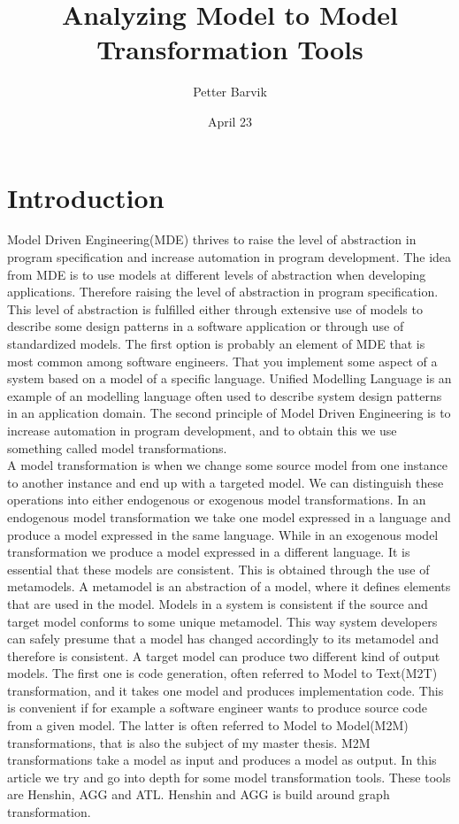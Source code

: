 \documentclass[pdftex,11pt,a4paper]{article}
\begin{document}
\title{Analyzing Model to Model Transformation
	   Tools}
\date{April 23}
\author{Petter Barvik}

\maketitle
\section{Introduction}

Model Driven Engineering(MDE)\cite{France2007} thrives to raise the level of abstraction in
program specification and increase automation in program development. The idea
from MDE is to use models at different levels of abstraction when developing
applications. Therefore raising the level of abstraction in program
specification. This level of abstraction is fulfilled either through extensive
use of models to describe some design patterns in a software application or
through use of standardized models. The first option is probably an element of
MDE that is most common among software engineers. That you implement some aspect
of a system based on a model of a specific language. Unified Modelling Language is
an example of an modelling language often used to describe system design
patterns in an application domain. The second principle of Model Driven
Engineering is to increase automation in program development, and to obtain this
we use something called model transformations. \\
\indent A model transformation is when we change some source model from one
instance to another instance and end up with a targeted model. We can
distinguish these operations into either endogenous or exogenous model
transformations. In an endogenous model transformation we take one model
expressed in a language and produce a model expressed in the same language.
While in an exogenous model transformation we produce a model expressed in a
different language. It is essential that these models are consistent. This is
obtained through the use of metamodels. A metamodel is an abstraction of a
model, where it defines elements that are used in the model. Models in a
system is consistent if the source and target model conforms to some unique 
metamodel. This way system developers can safely presume that a model has
changed accordingly to its metamodel and therefore is consistent. A target model
can produce two different kind of output models. The first one is code
generation, often referred to Model to Text(M2T) transformation, and it takes
one model and produces implementation code. This is convenient if for example a software
engineer wants to produce source code from a given model. The latter is often
referred to Model to Model(M2M) transformations, that is also the subject of
my master thesis. M2M transformations take a model as input and produces a model
as output. In this article we try and go into depth for some model
transformation tools. These tools are Henshin, AGG and ATL. Henshin and AGG is
build around graph transformation. 
\end{document}
